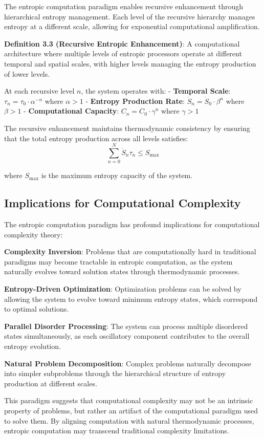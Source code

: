 \documentclass[12pt,a4paper]{article}
\theoremstyle{definition}
\begin{document}
The entropic computation paradigm enables recursive enhancement through hierarchical entropy management. Each level of the recursive hierarchy manages entropy at a different scale, allowing for exponential computational amplification.

\textbf{Definition 3.3 (Recursive Entropic Enhancement)}: A computational architecture where multiple levels of entropic processors operate at different temporal and spatial scales, with higher levels managing the entropy production of lower levels.

At each recursive level $n$, the system operates with:
- \textbf{Temporal Scale}: $\tau_n = \tau_0 \cdot \alpha^{-n}$ where $\alpha > 1$
- \textbf{Entropy Production Rate}: $\dot{S}_n = \dot{S}_0 \cdot \beta^n$ where $\beta > 1$
- \textbf{Computational Capacity}: $C_n = C_0 \cdot \gamma^n$ where $\gamma > 1$

The recursive enhancement maintains thermodynamic consistency by ensuring that the total entropy production across all levels satisfies:
$$\sum_{n=0}^{N} \dot{S}_n \tau_n \leq S_{\text{max}}$$

where $S_{\text{max}}$ is the maximum entropy capacity of the system.

\subsection{Implications for Computational Complexity}

The entropic computation paradigm has profound implications for computational complexity theory:

\textbf{Complexity Inversion}: Problems that are computationally hard in traditional paradigms may become tractable in entropic computation, as the system naturally evolves toward solution states through thermodynamic processes.

\textbf{Entropy-Driven Optimization}: Optimization problems can be solved by allowing the system to evolve toward minimum entropy states, which correspond to optimal solutions.

\textbf{Parallel Disorder Processing}: The system can process multiple disordered states simultaneously, as each oscillatory component contributes to the overall entropy evolution.

\textbf{Natural Problem Decomposition}: Complex problems naturally decompose into simpler subproblems through the hierarchical structure of entropy production at different scales.

This paradigm suggests that computational complexity may not be an intrinsic property of problems, but rather an artifact of the computational paradigm used to solve them. By aligning computation with natural thermodynamic processes, entropic computation may transcend traditional complexity limitations.
\end{document}
